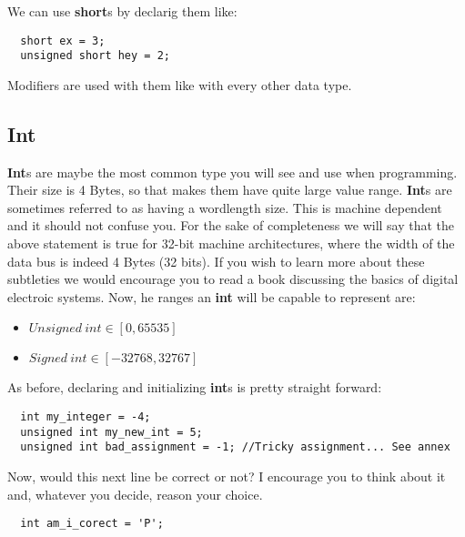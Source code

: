 \documentclass[12pt]{book}
\begin{document}
We can use \textbf{short}s by declarig them like:

\begin{verbatim}
  short ex = 3;
  unsigned short hey = 2;
\end{verbatim}

Modifiers are used with them like with every other data type.



\subsection{Int}

\textbf{Int}s are maybe the most common type you will see and use when programming. Their size is 4 Bytes, so that makes them have quite large value range. \textbf{Int}s are sometimes referred to as having a wordlength size. This is machine dependent and it should not confuse you. For the sake of completeness we will say that the above statement is true for 32-bit machine architectures, where the width of the data bus is indeed 4 Bytes (32 bits). If you wish to learn more about these subtleties we would encourage you to read a book discussing the basics of digital electroic systems. Now, he ranges an \textbf{int} will be capable to represent are:

\begin{itemize}
  \item $Unsigned\ int \in [0, 65535]$
  \item $Signed\ int \in [-32768, 32767]$
\end{itemize}

As before, declaring and initializing \textbf{int}s is pretty straight forward:

\begin{verbatim}
  int my_integer = -4;
  unsigned int my_new_int = 5;
  unsigned int bad_assignment = -1; //Tricky assignment... See annex
\end{verbatim}

Now, would this next line be correct or not? I encourage you to think about it and, whatever you decide, reason your choice.

\begin{verbatim}
  int am_i_corect = 'P';
\end{verbatim}
\end{document}
